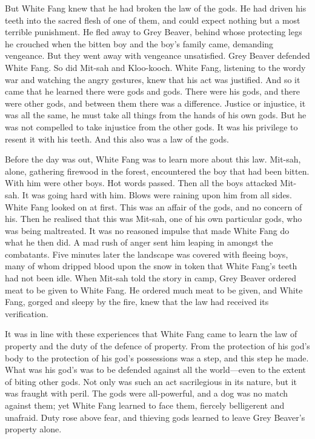 \documentclass[10pt]{book}
\begin{document}
But White Fang knew that he had broken the law of the gods. He had
driven his teeth into the sacred flesh of one of them, and could expect
nothing but a most terrible punishment. He fled away to Grey Beaver,
behind whose protecting legs he crouched when the bitten boy and the
boy’s family came, demanding vengeance. But they went away with
vengeance unsatisfied. Grey Beaver defended White Fang. So did Mit-sah
and Kloo-kooch. White Fang, listening to the wordy war and watching the
angry gestures, knew that his act was justified. And so it came that he
learned there were gods and gods. There were his gods, and there were
other gods, and between them there was a difference. Justice or
injustice, it was all the same, he must take all things from the hands
of his own gods. But he was not compelled to take injustice from the
other gods. It was his privilege to resent it with his teeth. And this
also was a law of the gods.

Before the day was out, White Fang was to learn more about this law.
Mit-sah, alone, gathering firewood in the forest, encountered the boy
that had been bitten. With him were other boys. Hot words passed. Then
all the boys attacked Mit-sah. It was going hard with him. Blows were
raining upon him from all sides. White Fang looked on at first. This
was an affair of the gods, and no concern of his. Then he realised that
this was Mit-sah, one of his own particular gods, who was being
maltreated. It was no reasoned impulse that made White Fang do what he
then did. A mad rush of anger sent him leaping in amongst the
combatants. Five minutes later the landscape was covered with fleeing
boys, many of whom dripped blood upon the snow in token that White
Fang’s teeth had not been idle. When Mit-sah told the story in camp,
Grey Beaver ordered meat to be given to White Fang. He ordered much
meat to be given, and White Fang, gorged and sleepy by the fire, knew
that the law had received its verification.

It was in line with these experiences that White Fang came to learn the
law of property and the duty of the defence of property. From the
protection of his god’s body to the protection of his god’s possessions
was a step, and this step he made. What was his god’s was to be
defended against all the world—even to the extent of biting other gods.
Not only was such an act sacrilegious in its nature, but it was fraught
with peril. The gods were all-powerful, and a dog was no match against
them; yet White Fang learned to face them, fiercely belligerent and
unafraid. Duty rose above fear, and thieving gods learned to leave Grey
Beaver’s property alone.
\end{document}
